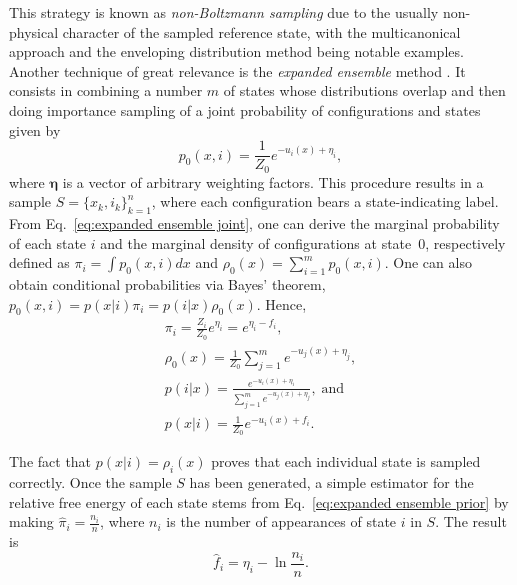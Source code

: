 \documentclass[
    journal=jctcce,
    layout=twocolumn
]{achemso}
\newcommand{\vt}[1]{\boldsymbol{\mathbf{#1}}}   %
\begin{document}
This strategy is known as \textit{non-Boltzmann sampling} \cite{Torrie_1977, Abreu_2006} due to the usually non-physical character of the sampled reference state, with the multicanonical approach \cite{Berg_1992} and the enveloping distribution method \cite{Christ_2007, *Christ_2008, *Christ_2009} being notable examples. Another technique of great relevance is the \textit{expanded ensemble} method \cite{Lyubartsev_1992}. It consists in combining a number $m$ of states whose distributions overlap and then doing importance sampling of a joint probability of configurations and states given by \cite{Nymeyer_2010}
\begin{equation}
\label{eq:expanded ensemble joint}
p_0(x, i) = \frac{1}{Z_0} e^{-u_i(x) + \eta_i},
\end{equation}
where $\vt \eta$ is a vector of arbitrary weighting factors. This procedure results in a sample $S = \{x_k,i_k\}_{k=1}^n$, where each configuration bears a state-indicating label. From Eq.~\eqref{eq:expanded ensemble joint}, one can derive the marginal probability of each state $i$ and the marginal density of configurations at state~$0$, respectively defined as $\pi_i = \int p_0(x,i)dx$ and $\rho_0(x) = \sum_{i=1}^m p_0(x,i)$. One can also obtain conditional probabilities via Bayes' theorem, $p_0(x,i) = p(x|i) \pi_i = p(i|x) \rho_0(x)$. Hence,
\begin{subequations}
	\label{eq:expanded ensemble probabilities}
	\begin{gather}
	\pi_i = \frac{Z_i}{Z_0} e^{\eta_i} = e^{\eta_i - f_i}, \label{eq:expanded ensemble prior} \\
	\rho_0(x) = \frac{1}{Z_0} \sum_{j=1}^m e^{-u_j(x) + \eta_j}, \label{eq:expanded ensemble evidence} \\
	p(i|x) = \frac{e^{-u_i(x) + \eta_i}}{\sum_{j=1}^m e^{-u_j(x) + \eta_j}}, \; \text{and} \label{eq:expanded ensemble posterior} \\
	p(x|i) = \frac{1}{Z_0} e^{-u_i(x) + f_i}. \label{eq:expanded ensemble likelihood}
	\end{gather}
\end{subequations}

The fact that $p(x|i) = \rho_i(x)$ proves that each individual state is sampled correctly. Once the sample $S$ has been generated, a simple estimator for the relative free energy of each state stems from Eq.~\eqref{eq:expanded ensemble prior} by making $\hat \pi_i = \frac{n_i}{n}$, where $n_i$ is the number of appearances of state $i$ in $S$. The result is
\begin{equation}
\label{eq:expanded ensemble histogram estimator}
\hat f_i = \eta_i - \ln \frac{n_i}{n}.
\end{equation}
\end{document}
